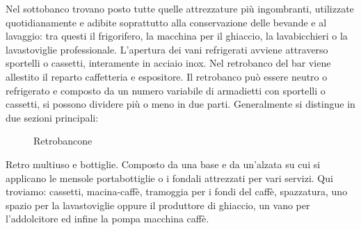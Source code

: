 Nel sottobanco trovano posto tutte quelle attrezzature più ingombranti, utilizzate quotidianamente e adibite soprattutto alla conservazione delle bevande e al lavaggio: tra questi il frigorifero, la macchina per il ghiaccio, la lavabicchieri o la lavastoviglie professionale. L'apertura dei vani refrigerati avviene attraverso sportelli o cassetti, interamente  in acciaio inox. Nel retrobanco del bar viene allestito il reparto caffetteria e espositore. Il retrobanco può essere neutro o refrigerato e composto da un numero variabile di armadietti con sportelli o cassetti, si possono dividere più o meno in due parti. Generalmente si distingue in due sezioni principali:


\begin{figure}[H]
	\captionsetup[subfloat]{farskip=2pt,captionskip=8pt}
	\centering
	\hspace{1cm}
	
	\caption{Retrobancone}
	\label{fig:imagesizes}
\end{figure}

\noindent
Retro multiuso e bottiglie. Composto da una base e da un'alzata su cui si applicano le mensole portabottiglie o i fondali attrezzati per vari servizi. Qui troviamo: cassetti, macina-caffè,  tramoggia per i fondi del caffè, spazzatura, uno spazio per la lavastoviglie oppure il produttore di ghiaccio, un vano per l’addolcitore ed infine la pompa macchina caffè.

